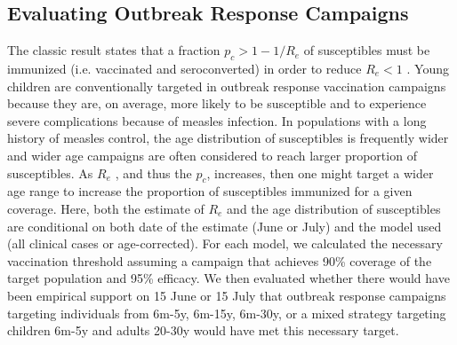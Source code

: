 \subsection{Evaluating Outbreak Response Campaigns}\label{ori}

The classic result states that a fraction \(p_c \gt 1-1/R_e\) of susceptibles must be immunized (i.e. vaccinated and seroconverted) in order to reduce \(R_e \lt 1\) \cite{Anderson_1981}. Young children are conventionally targeted in outbreak response vaccination campaigns because they are, on average, more likely to be susceptible and to experience severe complications because of measles infection. In populations with a long history of measles
control, the age distribution of susceptibles is frequently wider \cite{Ferrari_2013} and wider age campaigns are often considered to reach larger proportion of susceptibles. As \(R_e\) , and thus the \(p_c\), increases, then one might target a wider age range to increase the proportion of susceptibles immunized for a given coverage. Here, both the estimate of \(R_e\) and the age distribution of susceptibles are conditional on both date of the estimate (June or July) and the model used (all clinical cases or age-corrected). For each model, we calculated the necessary vaccination threshold assuming a campaign that achieves 90\% coverage of the target population and 95\% efficacy. We then evaluated whether there would have been empirical support on 15 June or 15 July that outbreak response campaigns targeting individuals from 6m-5y, 6m-15y, 6m-30y, or a mixed strategy targeting children 6m-5y and adults 20-30y would have met this necessary target.